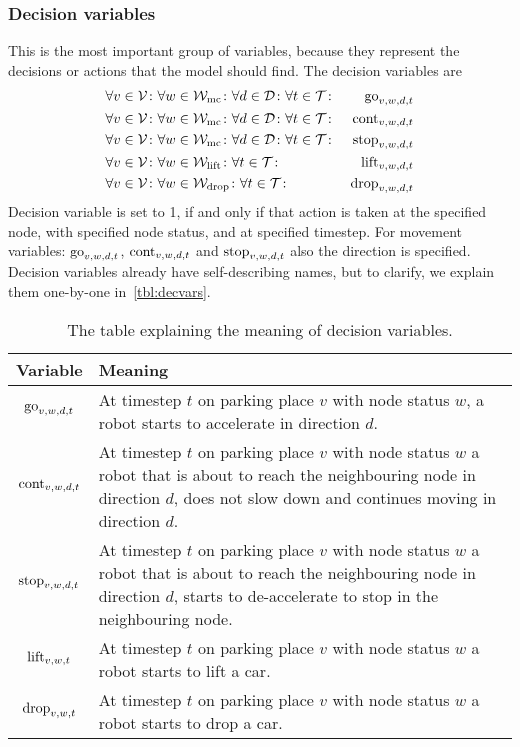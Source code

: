 \subsubsection{Decision variables}
This is the most important group of variables, because they represent the
decisions or actions that the model should find. The decision variables are
\begin{align}
    &\forall v \in \mathcal{V} \colon \forall w \in \mathcal{W}_\mathrm{mc} \colon \forall d \in \mathcal{D} \colon
    \forall t \in \mathcal{T} \colon & \mathrm{go}_{v,w,d,t}\\
    &\forall v \in \mathcal{V} \colon \forall w \in \mathcal{W}_\mathrm{mc} \colon \forall d \in \mathcal{D} \colon
    \forall t \in \mathcal{T} \colon & \mathrm{cont}_{v,w,d,t}\\
    &\forall v \in \mathcal{V} \colon \forall w \in \mathcal{W}_\mathrm{mc} \colon \forall d \in \mathcal{D} \colon
    \forall t \in \mathcal{T} \colon & \mathrm{stop}_{v,w,d,t}\\
    &\forall v \in \mathcal{V} \colon \forall w \in \mathcal{W}_\mathrm{lift} \colon \forall t \in \mathcal{T} \colon &
    \mathrm{lift}_{v,w,d,t}\\
    &\forall v \in \mathcal{V} \colon \forall w \in \mathcal{W}_\mathrm{drop} \colon \forall t \in \mathcal{T} \colon &
    \mathrm{drop}_{v,w,d,t}
\end{align}
Decision variable is set to 1, if and only if that action is taken at the
specified node, with specified node status, and at specified timestep. For
movement variables: $\mathrm{go}_{v,w,d,t}$, $\mathrm{cont}_{v,w,d,t}$ and $\mathrm{stop}_{v,w,d,t}$
also the direction is specified. Decision variables already have
self-describing names, but to clarify, we explain them one-by-one
in~\autoref{tbl:decvars}.

\begin{table}[h]
    \center
    \begin{tabular}{| c | p{\textwidth - 2.6cm} |}
        \hline
        Variable & Meaning\\
        \hline
        $\mathrm{go}_{v,w,d,t}$ & At timestep $t$ on parking place $v$ with node status
        $w$, a robot starts to accelerate in direction $d$.\\ \hline
        $\mathrm{cont}_{v,w,d,t}$ & At timestep $t$ on parking place $v$ with node status
        $w$ a robot that is about to reach the neighbouring node in direction
        $d$, does not slow down and continues moving in direction $d$.\\ \hline
        $\mathrm{stop}_{v,w,d,t}$ & At timestep $t$ on parking place $v$ with node status
        $w$ a robot that is about to reach the neighbouring node in direction
        $d$, starts to de-accelerate to stop in the neighbouring node.\\ \hline
        $\mathrm{lift}_{v,w,t}$ & At timestep $t$ on parking place $v$ with node status
        $w$ a robot starts to lift a car.\\ \hline
        $\mathrm{drop}_{v,w,t}$ & At timestep $t$ on parking place $v$ with node status
        $w$ a robot starts to drop a car.\\
        \hline
    \end{tabular}
    \caption{The table explaining the meaning of decision variables.}
    \label{tbl:decvars}
\end{table}

